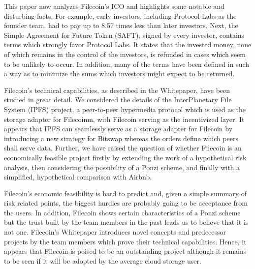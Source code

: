 \documentclass[conference]{IEEEtran}
\begin{document}
This paper now analyzes Filecoin's ICO and highlights some notable and disturbing facts.
For example, early investors, including Protocol Labs as the founder team, had to pay up to 8.57 times less than later investors.
Next, the Simple Agreement for Future Token (SAFT), signed by every investor, contains terms which strongly favor Protocol Labs.
It states that the invested money, none of which remains in the control of the investors, is refunded in cases which seem to be unlikely to occur. 
In addition, many of the terms have been defined in such a way as to minimize the sums which investors might expect to be returned.

Filecoin's technical capabilities, as described in the Whitepaper, have been studied in great detail.
We considered the details of the InterPlanetary File System (IPFS) project, a peer-to-peer hypermedia protocol which is used as the storage adapter for Filecoinm, with Filecoin serving as the incentivized layer.
It appears that IPFS can seamlessly serve as a storage adapter for Filecoin by introducing a new strategy for Bitswap whereas the orders define which peers shall serve data.
Further, we have raised the question of whether Filecoin is an economically feasible project firstly by extending the work of a hypothetical risk analysis, then considering the possibility of a Ponzi scheme, and finally with a simplified, hypothetical comparison with Airbnb.

Filecoin's economic feasibility is hard to predict and, given a simple summary of risk related points, the biggest hurdles are probably going to be acceptance from the users.
In addition, Filecoin shows certain characteristics of a Ponzi scheme but the trust built by the team members in the past leads us to believe that it is not one.
Filecoin's Whitepaper introduces novel concepts and predecessor projects by the team members which prove their technical capabilities.
Hence, it appears that Filecoin is poised to be an outstanding project although it remains to be seen if it will be adopted by the average cloud storage user.

\ifCLASSOPTIONcaptionsoff
  \newpage
\fi

\end{document}
